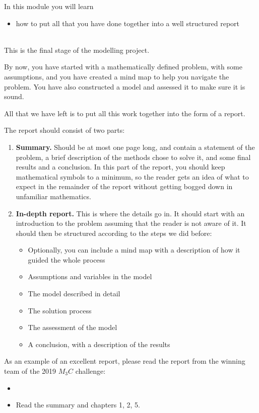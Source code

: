 \begin{siam}
In this module you will learn
\begin{itemize}
	\item how to put all that you have done together into a well structured report
\end{itemize}

\hfill \\



This is the final stage of the modelling project.

By now, you have started with a mathematically defined problem, with some assumptions, and you have created a mind map to help you navigate the problem.
You have also constructed a model and assessed it to make sure it is sound.

All that we have left is to put all this work together into the form of a report.



The report should consist of two parts:

\begin{enumerate}
	\item \textbf{Summary. } Should be at most one page long, and contain a statement of the problem, a brief description of the methods chose to solve it, and some final results and a conclusion. In this part of the report, you should keep mathematical symbols to a minimum, so the reader gets an idea of what to expect in the remainder of the report without getting bogged down in unfamiliar mathematics.

	\item \textbf{In-depth report. } This is where the details go in. It should start with an introduction to the problem assuming that the reader is not aware of it. It should then be structured according to the steps we did before:
	\begin{itemize}
		\item Optionally, you can include a mind map with a description of how it guided the whole process
		\item Assumptions and variables in the model
		\item The model described in detail
		\item The solution process
		\item The assessment of the model
		\item A conclusion, with a description of the results
	\end{itemize}
\end{enumerate}



\begin{example}
As an example of an excellent report, please read the report from the winning team of the 2019 $M_3C$ challenge:
\begin{itemize}
	\item {}
	\item Read the summary and chapters 1, 2, 5.
\end{itemize}
\end{example}

\end{siam}


